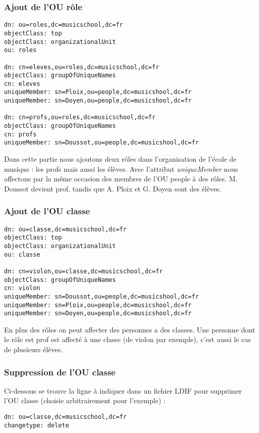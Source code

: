 \documentclass[12pt,a4paper,notitlepage]{article}
\begin{document}
\subsubsection{Ajout de l'OU rôle}

\begin{lstlisting}[title=role.ldif]
dn: ou=roles,dc=musicschool,dc=fr
objectClass: top
objectClass: organizationalUnit
ou: roles

dn: cn=eleves,ou=roles,dc=musicschool,dc=fr
objectClass: groupOfUniqueNames
cn: eleves
uniqueMember: sn=Ploix,ou=people,dc=musicshool,dc=fr
uniqueMember: sn=Doyen,ou=people,dc=musicshool,dc=fr

dn: cn=profs,ou=roles,dc=musicschool,dc=fr
objectClass: groupOfUniqueNames
cn: profs
uniqueMember: sn=Doussot,ou=people,dc=musicshool,dc=fr
\end{lstlisting}
Dans cette partie nous ajoutons deux rôles dans l'organisation de l'école de musique : les profs mais aussi les élèves. Avec l'attribut \textit{uniqueMember} nous affectons par la même occasion des membres de l'OU people à des rôles. M. Doussot devient prof, tandis que A. Ploix et G. Doyen sont des élèves.
\subsubsection{Ajout de l'OU classe}

\begin{lstlisting}[title=classe.ldif]
dn: ou=classe,dc=musicschool,dc=fr
objectClass: top
objectClass: organizationalUnit
ou: classe

dn: cn=violon,ou=classe,dc=musicschool,dc=fr
objectClass: groupOfUniqueNames
cn: violon
uniqueMember: sn=Doussot,ou=people,dc=musicshool,dc=fr
uniqueMember: sn=Ploix,ou=people,dc=musicshool,dc=fr
uniqueMember: sn=Doyen,ou=people,dc=musicshool,dc=fr
\end{lstlisting}
En plus des rôles on peut affecter des personnes a des classes. Une personne dont le rôle est prof est affecté à une classe (de violon par exemple), c'est aussi le cas de plusieurs élèves.
\subsubsection{Suppression de l'OU classe}
Ci-dessous se trouve la ligne à indiquer dans un fichier LDIF pour supprimer l'OU classe (choisie arbitrairement pour l'exemple) : 
\begin{lstlisting}[title=delete-classe.ldif]
dn: ou=classe,dc=musicschool,dc=fr
changetype: delete
\end{lstlisting}
\end{document}
